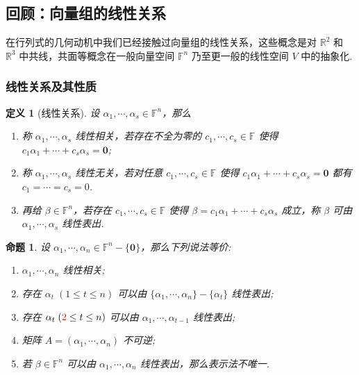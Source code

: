 \documentclass[10pt,openany]{article}
\theoremstyle{thmstyle} %
\theoremstyle{defstyle} %
\newtheorem{definition}[theorem]{定义}
\theoremstyle{prostyle} %
\newtheorem{proposition}[theorem]{命题}
\theoremstyle{exastyle}
\theoremstyle{remstyle}
\newcommand{\F}{\mathbb{F}}
\newcommand{\R}{\mathbb{R}}
\begin{document}
\subsection{回顾：向量组的线性关系}

在行列式的几何动机中我们已经接触过向量组的线性关系，这些概念是对 \( \R^2 \) 和 \( \R^3 \) 中共线，共面等概念在一般向量空间 \( \F^n \) 乃至更一般的线性空间 \( V \) 中的抽象化.

\subsubsection{线性关系及其性质}

\begin{definition}[线性关系]
	设 \( \alpha_1,\cdots,\alpha_s \in \F^n \)，那么
	\begin{enumerate}[(1)]
		\item 称 \( \alpha_1,\cdots,\alpha_s \) 线性相关，若存在不全为零的 \( c_1,\cdots,c_s \in \F \) 使得 \( c_1\alpha_1+\cdots+c_s\alpha_s= \bm{0} \);
		\item 称 \( \alpha_1,\cdots,\alpha_s \) 线性无关，若对任意 \( c_1,\cdots,c_s \in \F \) 使得 \( c_1\alpha_1+\cdots+c_s\alpha_s= \bm{0} \) 都有 \( c_1=\cdots=c_s=0 \).
		\item 再给 \( \beta \in \F^n \)，若存在 \( c_1,\cdots,c_s \in \F \) 使得 \( \beta= c_1\alpha_1+\cdots+c_s\alpha_s \) 成立，称 \( \beta \) 可由 \( \alpha_1,\cdots,\alpha_s \) 线性表出.
	\end{enumerate} 
\end{definition}

\begin{proposition} \label{5.1.2}
	设 \( \alpha_1,\cdots,\alpha_n \in \F^n-\{\bm{0}\} \)，那么下列说法等价:
	\begin{enumerate}
		\item[(1)] \( \alpha_1,\cdots,\alpha_n \) 线性相关;
		\item[(2)] 存在 \( \alpha_t \; (1 \leq t \leq n) \) 可以由 \( \{\alpha_1,\cdots,\alpha_n\}-\{\alpha_t\} \) 线性表出;
		\item[{\color{red} (2')}] 存在 \( \alpha_t \; ({\color{red} 2} \leq t \leq n) \) 可以由 \( \alpha_1,\cdots,\alpha_{t-1} \) 线性表出;
		\item[(3)] 矩阵 \( A=(\alpha_1,\cdots,\alpha_n) \) 不可逆;
		\item[(4)] 若 \( \beta \in \F^n \) 可以由 \( \alpha_1,\cdots,\alpha_n \) 线性表出，那么表示法不唯一.
	\end{enumerate}
\end{proposition}
\end{document}
